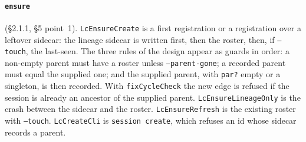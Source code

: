 \documentclass[a4paper,10pt,fleqn]{article}
\newcommand{\field}[1]{\texttt{#1}}
\begin{document}
\paragraph{\field{ensure}} (\S2.1.1, \S5 point~1). \field{LcEnsureCreate} is a
first registration or a registration over a leftover sidecar: the
lineage sidecar is written first, then the roster, then, if \field{--touch},
the last-seen. The three rules of the design appear as guards in order:
a non-empty parent must have a roster unless \field{--parent-gone}; a
recorded parent must equal the supplied one; and the supplied parent, with
\field{par?} empty or a singleton, is then recorded. With
\field{fixCycleCheck} the new edge is refused if the session is already an
ancestor of the supplied parent. \field{LcEnsureLineageOnly} is the crash
between the sidecar and the roster. \field{LcEnsureRefresh} is the existing
roster with \field{--touch}. \field{LcCreateCli} is \field{session create},
which refuses an id whose sidecar records a parent.
\end{document}
